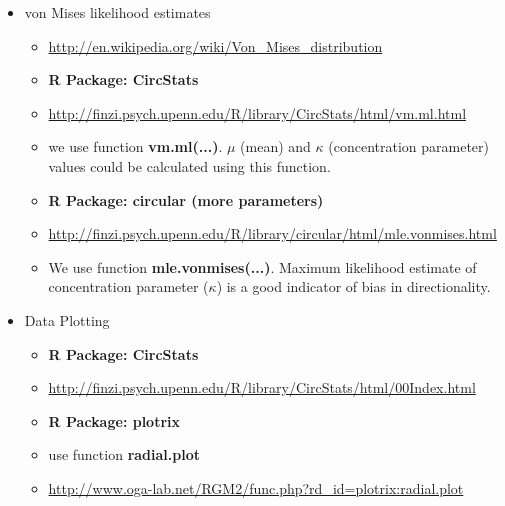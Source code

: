 \documentclass[11pnt, twocolumn]{article}
\begin{document}
\begin{itemize}
\item von Mises likelihood estimates
\begin{itemize}
\item \url{http://en.wikipedia.org/wiki/Von\_Mises\_distribution}
\item \textbf{R Package: CircStats}
\item \url{http://finzi.psych.upenn.edu/R/library/CircStats/html/vm.ml.html}
\item we use function \textbf{vm.ml(...)}. $\mu$ (mean) and $\kappa$ (concentration parameter) values could be calculated using this function. 
  
\item \textbf{R Package: circular (more parameters)}
\item \url{http://finzi.psych.upenn.edu/R/library/circular/html/mle.vonmises.html}
\item We use function \textbf{mle.vonmises(...)}. Maximum likelihood estimate of concentration parameter ($\kappa$) is a good indicator of bias in directionality. 
\end{itemize}
\end{itemize}

\begin{itemize}
\item Data Plotting
\begin{itemize}
\item \textbf{R Package: CircStats}
\item \url{http://finzi.psych.upenn.edu/R/library/CircStats/html/00Index.html}
\item \textbf{R Package: plotrix}
\item use function \textbf{radial.plot}
\item \url{http://www.oga-lab.net/RGM2/func.php?rd_id=plotrix:radial.plot}
\end{itemize}
\end{itemize}







\end{document}
